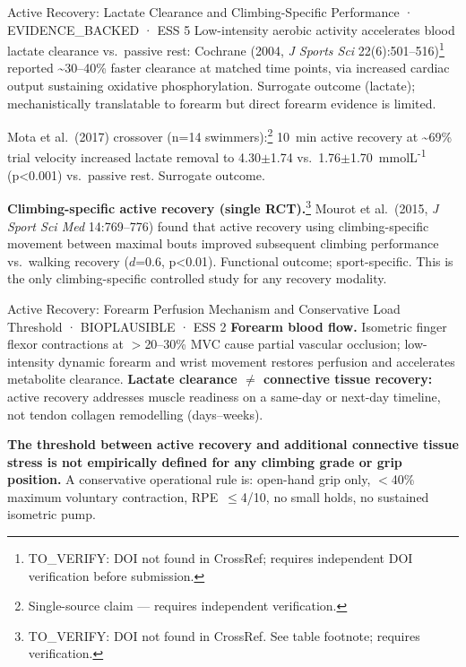 \begin{evidencebox}{Active Recovery: Lactate Clearance and Climbing-Specific Performance · EVIDENCE\_BACKED · ESS 5}
Low-intensity aerobic activity accelerates blood lactate clearance vs.\ passive rest: Cochrane (2004, \emph{J Sports Sci} 22(6):501--516)\footnote{TO\_VERIFY: DOI not found in CrossRef; requires independent DOI verification before submission.} reported \textasciitilde{}30--40\% faster clearance at matched time points, via increased cardiac output sustaining oxidative phosphorylation. Surrogate outcome (lactate); mechanistically translatable to forearm but direct forearm evidence is limited.

Mota et al.\ (2017) crossover (n=14 swimmers):\footnote{Single-source claim --- requires independent verification.} 10~min active recovery at \textasciitilde{}69\% trial velocity increased lactate removal to 4.30$\pm$1.74 vs.\ 1.76$\pm$1.70~mmol\textperiodcentered{}L\textsuperscript{-1} (p<0.001) vs.\ passive rest. Surrogate outcome. \cite{MDOE17}

\textbf{Climbing-specific active recovery (single RCT).}\footnote{TO\_VERIFY: DOI not found in CrossRef. See table footnote; requires verification.} Mourot et al.\ (2015, \emph{J Sport Sci Med} 14:769--776) found that active recovery using climbing-specific movement between maximal bouts improved subsequent climbing performance vs.\ walking recovery ($d$=0.6, p<0.01). Functional outcome; sport-specific. This is the only climbing-specific controlled study for any recovery modality.
\end{evidencebox}

\begin{bioplausbox}{Active Recovery: Forearm Perfusion Mechanism and Conservative Load Threshold · BIOPLAUSIBLE · ESS 2}
\textbf{Forearm blood flow.} Isometric finger flexor contractions at $>$20--30\% MVC cause partial vascular occlusion; low-intensity dynamic forearm and wrist movement restores perfusion and accelerates metabolite clearance. \textbf{Lactate clearance $\neq$ connective tissue recovery:} active recovery addresses muscle readiness on a same-day or next-day timeline, not tendon collagen remodelling (days--weeks).

\textbf{The threshold between active recovery and additional connective tissue stress is not empirically defined for any climbing grade or grip position.} A conservative operational rule is: open-hand grip only, $<$40\% maximum voluntary contraction, RPE~$\leq$4/10, no small holds, no sustained isometric pump.
\end{bioplausbox}

